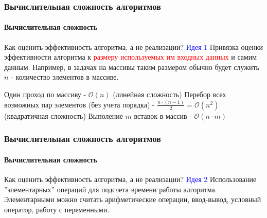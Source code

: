 \documentclass[aspectratio=169]{beamer}
\begin{document}
\begin{frame}
\frametitle{Вычислительная сложность алгоритмов}
\framesubtitle{Вычислительная сложность}
\justifying
Как оценить эффективность алгоритма, а не реализации?\newline\newline
\textcolor{blue}{Идея 1}
Привязка оценки эффективности алгоритма к \textcolor{red}{размеру используемых им входных данных} и самим данным.\newline\newline
Например, в задачах на массивы таким размером обычно будет служить $n$ - количество элементов в массиве.\newline

Один проход по массиву - $\mathcal{O}(n)$ (линейная сложность)\newline\newline
Перебор всех возможных пар элементов (без учета порядка) - $\frac{n \cdot (n-1)}{2} = \mathcal{O}(n^2)$ (квадратичная сложность)\newline\newline
Выполение $m$ вставок в массив - $\mathcal{O}{(n \cdot m)}$\newline


\end{frame}	

\begin{frame}
\frametitle{Вычислительная сложность алгоритмов}
\framesubtitle{Вычислительная сложность}
\justifying
\small
Как оценить эффективность алгоритма, а не реализации?\newline\newline
\textcolor{blue}{Идея 2}
Использование  ”элементарных” операций для подсчета времени работы алгоритма.  Элементарными можно считать арифметические операции, ввод-вывод, условный оператор, работу с переменными.
\begin{figure}
    \captionsetup[subfigure]{labelformat=empty}
    \centering
\end{figure}
\end{frame}	
\end{document}
